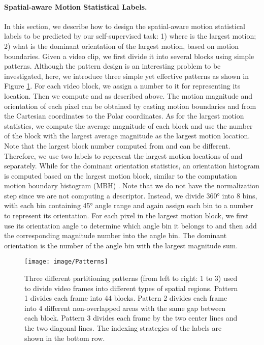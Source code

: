 \documentclass[10pt,twocolumn,letterpaper]{article}
\begin{document}
\paragraph{Spatial-aware Motion Statistical Labels.} In this section, we describe how to design the spatial-aware motion statistical labels to be predicted by our self-supervised task: 1) where is the largest motion; 2) what is the dominant orientation of the largest motion, based on motion boundaries. 
Given a video clip, we first divide it into several blocks using simple patterns. 
Although the pattern design is an interesting problem to be investigated, here, we introduce three simple yet effective patterns as shown in Figure \ref{fig:pattern}. 
For each video block, we assign a number to it for representing its location. 
Then we compute  and  as described above.
The motion magnitude and orientation of each pixel can be obtained by casting motion boundaries  and  from the Cartesian coordinates to the Polar coordinates. 
As for the largest motion statistics, we compute the average magnitude of each block and use the number of the block with the largest average magnitude as the largest motion location.  
Note that the largest block number computed from  and  can be different. 
Therefore, we use two labels to represent the largest motion locations of  and  separately. 
While for the dominant orientation statistics, an orientation histogram is computed based on the largest motion block, similar to the computation motion boundary histogram (MBH) \cite{dalal2006human}. 
Note that we do not have the normalization step since we are not computing a descriptor. 
Instead, we divide \ang{360} into 8 bins, with each bin containing  \ang{45} angle range and again assign each bin to a number to represent its orientation. 
For each pixel in the largest motion block, we first use its orientation angle to determine which angle bin it belongs to and then add the corresponding magnitude number into the angle bin. 
The dominant orientation is the number of the angle bin with the largest magnitude sum.   

\begin{figure}
    \centering
    \texttt{[image: image/Patterns]}
    \caption{Three different partitioning patterns (from left to right: 1 to 3) used to divide video frames into different types of spatial regions. Pattern 1 divides each frame into 44 blocks. Pattern 2 divides each frame into 4 different non-overlapped areas with the same gap between each block. Pattern 3 divides each frame by the two center lines and the two diagonal lines. The indexing strategies of the labels are shown in the bottom row. }
    \label{fig:pattern}\vspace{-3mm}
\end{figure}
\end{document}
